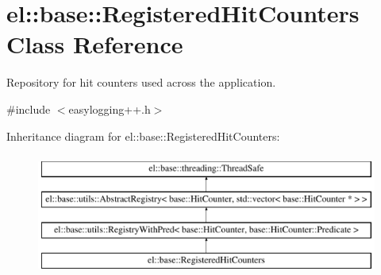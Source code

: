 \hypertarget{classel_1_1base_1_1RegisteredHitCounters}{\section{el\-:\-:base\-:\-:Registered\-Hit\-Counters Class Reference}
\label{classel_1_1base_1_1RegisteredHitCounters}
}


Repository for hit counters used across the application.  




{\ttfamily \#include $<$easylogging++.\-h$>$}

Inheritance diagram for el\-:\-:base\-:\-:Registered\-Hit\-Counters\-:\begin{figure}[H]
\begin{center}
\leavevmode
\includegraphics[height=4.000000cm]{classel_1_1base_1_1RegisteredHitCounters}
\end{center}
\end{figure}
